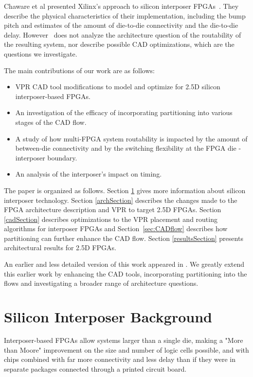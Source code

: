 \documentclass[journal]{IEEEtran}
\begin{document}
Chaware et al presented Xilinx's approach to silicon interposer FPGAs~\cite{xilinxTSV}. They describe the physical characteristics of their implementation, including the bump pitch and estimates of the amount of die-to-die connectivity and the die-to-die delay. However~\cite{xilinxTSV} does not analyze the architecture question of the routability of the resulting system, nor describe possible CAD optimizations, which are the questions we investigate.

The main contributions of our work are as follows:
\begin{itemize}
	\item VPR CAD tool modifications to model and optimize for 2.5D silicon interposer-based FPGAs.
	\item An investigation of the efficacy of incorporating partitioning into various stages of the CAD flow.
	\item A study of how multi-FPGA system routability is impacted by the amount of between-die connectivity and by the switching flexibility at the FPGA die - interposer boundary.
	\item An analysis of the interposer's impact on timing.
\end{itemize}

The paper is organized as follows. Section \ref{siliconSection} gives more information about silicon interposer technology. Section \ref{archSection} describes the changes made to the FPGA architecture description and VPR to target 2.5D FPGAs. Section \ref{cadSection} describes optimizations to the VPR placement and routing algorithms for interposer FPGAs and Section~\ref{sec:CADflow} describes how partitioning can further enhance the CAD flow. Section \ref{resultsSection} presents architectural results for 2.5D FPGAs.

An earlier and less detailed version of this work appeared in \cite{interposer2014}. We greatly extend this earlier work by enhancing the CAD tools, incorporating partitioning into the flows and investigating a broader range of architecture questions. 


\section{Silicon Interposer Background}
\label{siliconSection}

Interposer-based FPGAs allow systems larger than a single die, making a "More than Moore" improvement \cite{arden2010morethan} on the size and number of logic cells possible, and with chips combined with far more connectivity and less delay than if they were in separate packages connected through a printed circuit board. 
\end{document}
